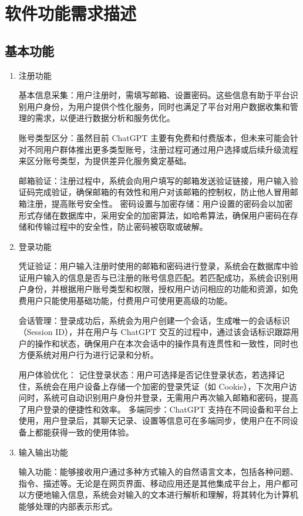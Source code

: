 \documentclass[
    report,     %
    oneside,    %
    UTF8,       %
    zihao=-4    %
]{config} %
\begin{document}
\section{软件功能需求描述}
\subsection{基本功能}
\begin{enumerate}[label=(\arabic*)]
\item 注册功能

基本信息采集：用户注册时，需填写邮箱、设置密码。这些信息有助于平台识别用户身份，为用户提供个性化服务，同时也满足了平台对用户数据收集和管理的需求，以便进行数据分析和服务优化。

账号类型区分：虽然目前 ChatGPT 主要有免费和付费版本，但未来可能会针对不同用户群体推出更多类型账号，注册过程可通过用户选择或后续升级流程来区分账号类型，为提供差异化服务奠定基础。

邮箱验证：注册过程中，系统会向用户填写的邮箱发送验证链接，用户输入验证码完成验证，确保邮箱的有效性和用户对该邮箱的控制权，防止他人冒用邮箱注册，提高账号安全性。
密码设置与加密存储：用户设置的密码会以加密形式存储在数据库中，采用安全的加密算法，如哈希算法，确保用户密码在存储和传输过程中的安全性，防止密码被窃取或破解。
\item 登录功能

凭证验证：用户输入注册时使用的邮箱和密码进行登录，系统会在数据库中验证用户输入的信息是否与已注册的账号信息匹配。若匹配成功，系统会识别用户身份，并根据用户账号类型和权限，授权用户访问相应的功能和资源，如免费用户只能使用基础功能，付费用户可使用更高级的功能。

会话管理：登录成功后，系统会为用户创建一个会话，生成唯一的会话标识（Session ID），并在用户与 ChatGPT 交互的过程中，通过该会话标识跟踪用户的操作和状态，确保用户在本次会话中的操作具有连贯性和一致性，同时也方便系统对用户行为进行记录和分析。

用户体验优化：
记住登录状态：用户可选择是否记住登录状态，若选择记住，系统会在用户设备上存储一个加密的登录凭证（如 Cookie），下次用户访问时，系统可自动识别用户身份并登录，无需用户再次输入邮箱和密码，提高了用户登录的便捷性和效率。
多端同步：ChatGPT 支持在不同设备和平台上使用，用户登录后，其聊天记录、设置等信息可在多端同步，使用户在不同设备上都能获得一致的使用体验。
\item 输入输出功能

输入功能：能够接收用户通过多种方式输入的自然语言文本，包括各种问题、指令、描述等。无论是在网页界面、移动应用还是其他集成平台上，用户都可以方便地输入信息，系统会对输入的文本进行解析和理解，将其转化为计算机能够处理的内部表示形式。


\end{enumerate}
\end{document}

